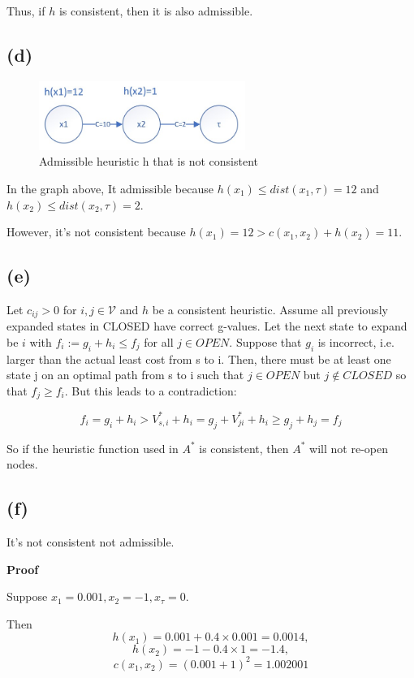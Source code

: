 \documentclass{article} %
\begin{document}
Thus, if $h$ is consistent, then it is also admissible.


\subsection{(d)}

\begin{figure}[H]
	\centering
    \includegraphics[width=0.6\textwidth]{images/p2_4.jpg}
    \caption{Admissible heuristic h that is not consistent}
\end{figure} 

In the graph above, It admissible because 
$h(x_1) \leq dist(x_1, \tau) = 12$ and $h(x_2) \leq dist(x_2, \tau) = 2$.

However, it's not consistent because $h(x_1) = 12 > c(x_1, x_2) + h(x_2) = 11$.

\subsection{(e)}
Let $c_{i j}>0$ for $i, j \in \mathcal{V}$ and $h$ be a consistent heuristic.
Assume all previously expanded states in CLOSED have correct g-values. Let the next state to expand be $i$ with $f_{i} :=g_{i}+h_{i} \leq f_{j}$ for all $j \in O P E N$. Suppose that $g_{i}$ is incorrect, i.e. larger than the actual least cost from s to i. Then, there must be at least one state j on an optimal path from s to i such that $j \in O P E N$ but $j \notin C L O S E D$ so that $f_{j} \geq f_{i}$. But this leads to a contradiction:

$$f_{i}=g_{i}+h_{i}>V_{s, i}^{*}+h_{i}=g_{j}+V_{j i}^{*}+h_{i} \geq  g_{j}+h_{j}=f_{j}$$

So if the heuristic function used in $A^{*}$ is consistent, then $A^{*}$ will not re-open nodes.

\subsection{(f)}
It's not consistent not admissible.

\textbf{Proof}

Suppose $x_1 = 0.001, x_2 = -1, x_{\tau} = 0$.

Then $$h(x_1) = 0.001 + 0.4 \times 0.001 = 0.0014, $$ $$h(x_2) = -1 - 0.4 \times 1 = -1.4, $$ $$c(x_1, x_2) = (0.001 + 1)^2 = 1.002001$$
\end{document}
